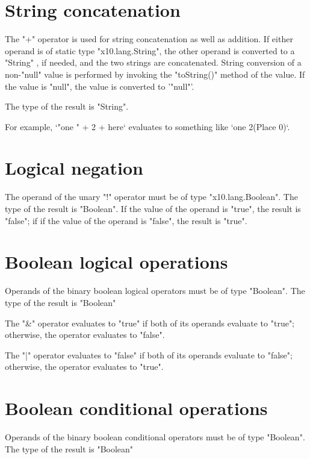 \section{String concatenation}

The \xcd"+"  operator is used for string concatenation 
 as well as addition.
If either operand is of static type \xcd"x10.lang.String",
 the other operand is converted to a \xcd"String" , if needed,
  and  the two strings  are concatenated.
 String conversion of a non-\xcd"null" value is  performed by invoking the
 \xcd"toString()" method of the value.
  If the value is \xcd"null", the value is converted to 
  \xcd'"null"'.

The type of the result is \xcd"String".

 For example, 
      \xcd`"one " + 2 + here` 
      evaluates to something like \xcd`one 2(Place 0)`.  

\section{Logical negation}

The operand of the  unary \xcd"!" operator 
must be of type \xcd"x10.lang.Boolean".
The type of the result is \xcd"Boolean".
If the value of the operand is \xcd"true", the result is \xcd"false"; if
if the value of the operand  is \xcd"false", the result is \xcd"true".

\section{Boolean logical operations}

Operands of the binary boolean logical operators must be of type \xcd"Boolean".
The type of the result is \xcd"Boolean"

The \xcd"&" operator  evaluates to \xcd"true" if both of its
operands evaluate to \xcd"true"; otherwise, the operator
evaluates to \xcd"false".

The \xcd"|" operator  evaluates to \xcd"false" if both of its
operands evaluate to \xcd"false"; otherwise, the operator
evaluates to \xcd"true".

\section{Boolean conditional operations}

Operands of the binary boolean conditional operators must be of type
\xcd"Boolean". 
The type of the result is \xcd"Boolean"

